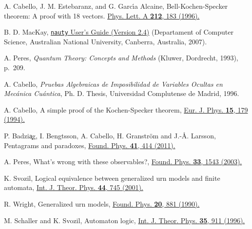 \documentclass[%
 twocolumn,
 groupedaddress,
 showpacs,
 showkeys,
 preprintnumbers,
 amsmath,amssymb,
 aps,
 pra,
 longbibliography,
 floatfix,
 ]{revtex4-1}
\begin{document}
\begin{thebibliography}{99}
 A. Cabello, J. M. Estebaranz, and G. Garc\'{\i}a Alcaine,
 Bell-Kochen-Specker theorem: A proof with 18 vectors.
 \href{http://dx.doi.org/10.1016/0375-9601(96)00134-X}{Phys. Lett. A \textbf{212}, 183 (1996).}


 B. D. MacKay,
 \href{http://cs.anu.edu.au/~Brendan.McKay/nauty/nug.pdf}{\texttt{nauty} User's Guide (Version 2.4)}
 (Departament of Computer Science, Australian National University, Canberra, Australia, 2007).

 A. Peres,
 \emph{Quantum Theory: Concepts and Methods} (Kluwer, Dordrecht, 1993), p.~209.


 A. Cabello,
 \emph{Pruebas Algebraicas de Imposibilidad de Variables Ocultas en Mec{\'a}nica Cu{\'a}ntica}, Ph. D. Thesis, Universidad Complutense de Madrid, 1996.

A. Cabello,
A simple proof of the Kochen-Specker theorem,
\href{https://doi.org/10.1088/0143-0807/15/4/004}{Eur. J. Phys. \textbf{15}, 179 (1994).}

P. Badzi{\c a}g, I. Bengtsson, A. Cabello, H. Granstr\"om and J.-\AA. Larsson,
Pentagrams and paradoxes,
\href{https://doi.org/10.1007/s10701-010-9433-3}{Found. Phys. \textbf{41}, 414 (2011).}


 A. Peres,
 What's wrong with these observables?,
\href{https://doi.org/10.1023/A:1026000614638}{Found. Phys. \textbf{33}, 1543 (2003).}

K. Svozil,
Logical equivalence between generalized urn models and finite automata,
\href{http://doi.org/10.1007/s10773-005-7052-0}{Int. J. Theor. Phys. \textbf{44}, 745 (2001).}

R. Wright,
Generalized urn models,
\href{http://doi.org/10.1007/BF01889696}{Found. Phys. \textbf{20}, 881 (1990).}

M. Schaller and K. Svozil,
Automaton logic,
\href{http://doi.org/10.1007/BF02302381}{Int. J. Theor. Phys. \textbf{35}, 911 (1996).}


\end{thebibliography}

\end{document}
